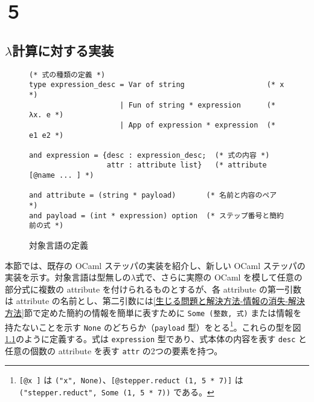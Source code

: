 \chapter{５}
\label{chapter:incremental}







\section{$\lambda$計算に対する実装}

\begin{figure}
\begin{verbatim}
(* 式の種類の定義 *)
type expression_desc = Var of string                   (* x *)
                     | Fun of string * expression      (* λx. e *)
                     | App of expression * expression  (* e1 e2 *)
                              
and expression = {desc : expression_desc;  (* 式の内容 *)
                  attr : attribute list}   (* attribute [@name ... ] *)

and attribute = (string * payload)       (* 名前と内容のペア *)
and payload = (int * expression) option  (* ステップ番号と簡約前の式 *)
\end{verbatim}
\caption{対象言語の定義}
\label{figure:lambda}
\end{figure}

本節では、既存の OCaml ステッパ\cite{FSA18}の実装を紹介し、新しい OCaml ステッパの実装を示す。対象言語は型無しの$\lambda$式で、さらに実際の OCaml を模して任意の部分式に複数の attribute を付けられるものとするが、各 attribute の第一引数は attribute の名前とし、第二引数には\ref{生じる問題と解決方法-情報の消失-解決方法}節で定めた簡約の情報を簡単に表すために \texttt{Some (整数, 式)} または情報を持たないことを示す \texttt{None} のどちらか（\texttt{payload} 型）をとる\footnote{\texttt{[@x ]} は \texttt{("x", None)}、\texttt{[@stepper.reduct (1, 5 * 7)]} は \texttt{("stepper.reduct", Some (1, 5 * 7))} である。}。これらの型を図\ref{figure:lambda}のように定義する。式は \texttt{expression} 型であり、式本体の内容を表す \texttt{desc} と任意の個数の attribute を表す \texttt{attr} の2つの要素を持つ。









